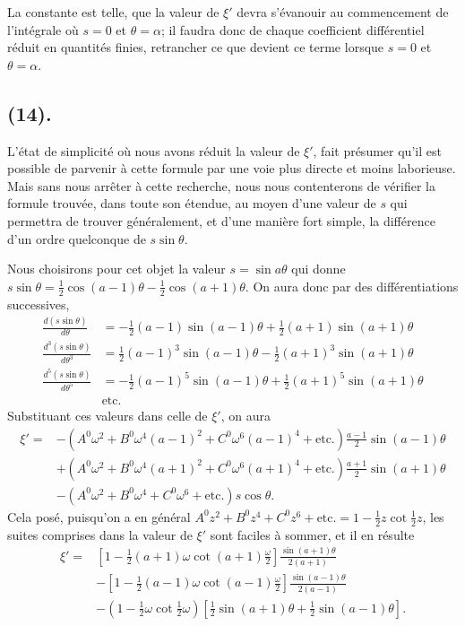 \documentclass{article}
\begin{document}
La constante est telle, que la valeur de $\xi'$ devra s'évanouir au commencement de l'intégrale où $s=0$ et $\theta=\alpha$; il faudra donc de chaque coefficient différentiel réduit en quantités finies, retrancher ce que devient ce terme lorsque $s=0$ et $\theta=\alpha$.

\subsection*{(14).}

L'état de simplicité où nous avons réduit la valeur de $\xi'$, fait présumer qu'il est possible de parvenir à cette formule par une voie plus directe et moins laborieuse. Mais sans nous arrêter à cette recherche, nous nous contenterons de vérifier la formule trouvée, dans toute son étendue, au moyen d'une valeur de $s$ qui permettra de trouver généralement, et d'une manière fort simple, la différence d'un ordre quelconque de $s\sin\theta$.

Nous choisirons pour cet objet la valeur $s=\sin a\theta$ qui donne $s\sin\theta=\frac{1}{2}\cos(a-1)\theta-\frac{1}{2}\cos(a+1)\theta$. On aura donc par des différentiations successives,
\[ \begin{aligned} \frac{d(s\sin\theta)}{d\theta}&=-\tfrac{1}{2}(a-1)\sin(a-1)\theta+\tfrac{1}{2}(a+1)\sin(a+1)\theta\\ \frac{d^{3}(s\sin\theta)}{d\theta^{3}}&=\tfrac{1}{2}(a-1)^{3}\sin(a-1)\theta-\tfrac{1}{2}(a+1)^{3}\sin(a+1)\theta\\ \frac{d^{5}(s\sin\theta)}{d\theta^{5}}&=-\tfrac{1}{2}(a-1)^{5}\sin(a-1)\theta+\tfrac{1}{2}(a+1)^{5}\sin(a+1)\theta\\ &\text{etc.} \end{aligned} \]
Substituant ces valeurs dans celle de $\xi'$, on aura
\[ \begin{aligned} \xi'={}&-(A^{0}\omega^{2}+B^{0}\omega^{4}(a-1)^{2}+C^{0}\omega^{6}(a-1)^{4}+\text{etc.})\frac{a-1}{2}\sin(a-1)\theta\\ &+(A^{0}\omega^{2}+B^{0}\omega^{4}(a+1)^{2}+C^{0}\omega^{6}(a+1)^{4}+\text{etc.})\frac{a+1}{2}\sin(a+1)\theta\\ &-(A^{0}\omega^{2}+B^{0}\omega^{4}+C^{0}\omega^{6}+\text{etc.})s\cos\theta. \end{aligned} \]
Cela posé, puisqu'on a en général $A^{0}z^{2}+B^{0}z^{4}+C^{0}z^{6}+\text{etc.}=1-\frac{1}{2}z\cot\frac{1}{2}z$, les suites comprises dans la valeur de $\xi'$ sont faciles à sommer, et il en résulte
\[ \begin{aligned} \xi'={}&\left[1-\tfrac{1}{2}(a+1)\omega\cot(a+1)\frac{\omega}{2}\right]\frac{\sin(a+1)\theta}{2(a+1)}\\ &-\left[1-\tfrac{1}{2}(a-1)\omega\cot(a-1)\frac{\omega}{2}\right]\frac{\sin(a-1)\theta}{2(a-1)}\\ &-(1-\tfrac{1}{2}\omega\cot\tfrac{1}{2}\omega)[\tfrac{1}{2}\sin(a+1)\theta+\tfrac{1}{2}\sin(a-1)\theta]. \end{aligned} \]
\end{document}
